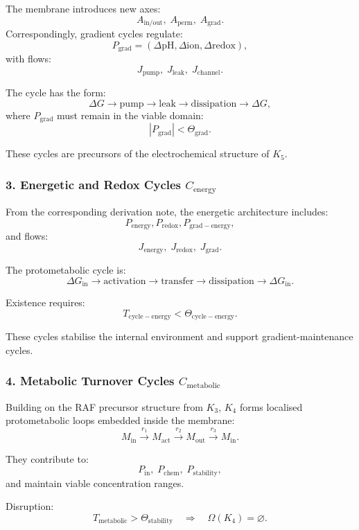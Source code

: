 The membrane introduces new axes:
\[
  A_{\mathrm{in/out}},\;
  A_{\mathrm{perm}},\;
  A_{\mathrm{grad}}.
\]
Correspondingly, gradient cycles regulate:
\[
  P_{\mathrm{grad}}=
    (\Delta \mathrm{pH}, \Delta \mathrm{ion}, \Delta \mathrm{redox}),
\]
with flows:
\[
  J_{\mathrm{pump}},\;
  J_{\mathrm{leak}},\;
  J_{\mathrm{channel}}.
\]

The cycle has the form:
\[
  \Delta G \to \mathrm{pump} \to
  \mathrm{leak} \to \mathrm{dissipation} \to
  \Delta G,
\]
where $P_{\mathrm{grad}}$ must remain in the viable domain:
\[
  |P_{\mathrm{grad}}| < \Theta_{\mathrm{grad}}.
\]

These cycles are precursors of the electrochemical structure of $K_5$.

\subsubsection{3. Energetic and Redox Cycles $C_{\mathrm{energy}}$}

From the corresponding derivation note, the energetic architecture includes:
\[
  P_{\mathrm{energy}},
  P_{\mathrm{redox}},
  P_{\mathrm{grad-energy}},
\]
and flows:
\[
  J_{\mathrm{energy}},\;
  J_{\mathrm{redox}},\;
  J_{\mathrm{grad}}.
\]

The protometabolic cycle is:
\[
  \Delta G_{\mathrm{in}} \to 
  \mathrm{activation} \to
  \mathrm{transfer} \to 
  \mathrm{dissipation} \to 
  \Delta G_{\mathrm{in}}.
\]

Existence requires:
\[
  T_{\mathrm{cycle-energy}} < \Theta_{\mathrm{cycle-energy}}.
\]

These cycles stabilise the internal environment and support
gradient-maintenance cycles.

\subsubsection{4. Metabolic Turnover Cycles $C_{\mathrm{metabolic}}$}

Building on the RAF precursor structure from $K_3$, $K_4$ forms
localised protometabolic loops embedded inside the membrane:
\[
  M_{\mathrm{in}} \xrightarrow{r_1}
  M_{\mathrm{act}} \xrightarrow{r_2}
  M_{\mathrm{out}} \xrightarrow{r_3}
  M_{\mathrm{in}}.
\]

They contribute to:
\[
  P_{\mathrm{in}},\; P_{\mathrm{chem}},\; P_{\mathrm{stability}},
\]
and maintain viable concentration ranges.

Disruption:
\[
  T_{\mathrm{metabolic}}>\Theta_{\mathrm{stability}}
\quad\Rightarrow\quad
  \Omega(K_4)=\varnothing.
\]

